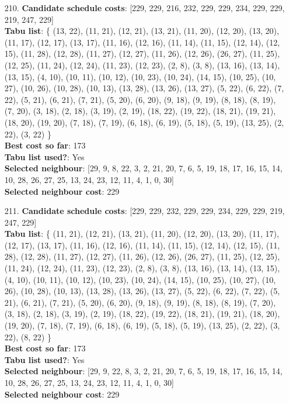 \documentclass[fleqn]{article}
\begin{document}
\begin{itemize}
    \item[210.] \textbf{Candidate schedule costs}: [229, 229, 216, 232, 229, 229, 234, 229, 229, 219, 247, 229] \\
    \textbf{Tabu list}: \{ (13, 22), (11, 21), (12, 21), (13, 21), (11, 20), (12, 20), (13, 20), (11, 17), (12, 17), (13, 17), (11, 16), (12, 16), (11, 14), (11, 15), (12, 14), (12, 15), (11, 28), (12, 28), (11, 27), (12, 27), (11, 26), (12, 26), (26, 27), (11, 25), (12, 25), (11, 24), (12, 24), (11, 23), (12, 23), (2, 8), (3, 8), (13, 16), (13, 14), (13, 15), (4, 10), (10, 11), (10, 12), (10, 23), (10, 24), (14, 15), (10, 25), (10, 27), (10, 26), (10, 28), (10, 13), (13, 28), (13, 26), (13, 27), (5, 22), (6, 22), (7, 22), (5, 21), (6, 21), (7, 21), (5, 20), (6, 20), (9, 18), (9, 19), (8, 18), (8, 19), (7, 20), (3, 18), (2, 18), (3, 19), (2, 19), (18, 22), (19, 22), (18, 21), (19, 21), (18, 20), (19, 20), (7, 18), (7, 19), (6, 18), (6, 19), (5, 18), (5, 19), (13, 25), (2, 22), (3, 22) \} \\
    \textbf{Best cost so far}: 173 \\
    \textbf{Tabu list used?}: Yes \\
    \textbf{Selected neighbour}: [29, 9, 8, 22, 3, 2, 21, 20, 7, 6, 5, 19, 18, 17, 16, 15, 14, 10, 28, 26, 27, 25, 13, 24, 23, 12, 11, 4, 1, 0, 30] \\
    \textbf{Selected neighbour cost}: 229
      

    \item[211.] \textbf{Candidate schedule costs}: [229, 229, 232, 229, 229, 234, 229, 229, 219, 247, 229] \\
    \textbf{Tabu list}: \{ (11, 21), (12, 21), (13, 21), (11, 20), (12, 20), (13, 20), (11, 17), (12, 17), (13, 17), (11, 16), (12, 16), (11, 14), (11, 15), (12, 14), (12, 15), (11, 28), (12, 28), (11, 27), (12, 27), (11, 26), (12, 26), (26, 27), (11, 25), (12, 25), (11, 24), (12, 24), (11, 23), (12, 23), (2, 8), (3, 8), (13, 16), (13, 14), (13, 15), (4, 10), (10, 11), (10, 12), (10, 23), (10, 24), (14, 15), (10, 25), (10, 27), (10, 26), (10, 28), (10, 13), (13, 28), (13, 26), (13, 27), (5, 22), (6, 22), (7, 22), (5, 21), (6, 21), (7, 21), (5, 20), (6, 20), (9, 18), (9, 19), (8, 18), (8, 19), (7, 20), (3, 18), (2, 18), (3, 19), (2, 19), (18, 22), (19, 22), (18, 21), (19, 21), (18, 20), (19, 20), (7, 18), (7, 19), (6, 18), (6, 19), (5, 18), (5, 19), (13, 25), (2, 22), (3, 22), (8, 22) \} \\
    \textbf{Best cost so far}: 173 \\
    \textbf{Tabu list used?}: Yes \\
    \textbf{Selected neighbour}: [29, 9, 22, 8, 3, 2, 21, 20, 7, 6, 5, 19, 18, 17, 16, 15, 14, 10, 28, 26, 27, 25, 13, 24, 23, 12, 11, 4, 1, 0, 30] \\
    \textbf{Selected neighbour cost}: 229
      


\end{itemize}
\end{document}
